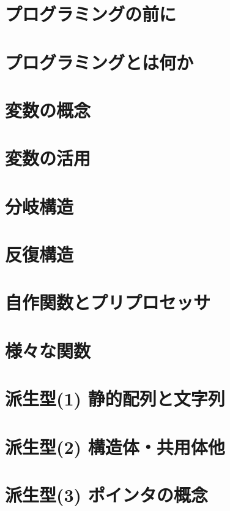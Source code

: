 \documentclass[a4j,12pt]{jreport}
\begin{document}
\tableofcontents
\newpage
{}
\setcounter{chapter}{-1}
\chapter{プログラミングの前に}


\chapter{プログラミングとは何か}


\chapter{変数の概念}


\chapter{変数の活用}


\chapter{分岐構造}


\chapter{反復構造}


\chapter{自作関数とプリプロセッサ}


\chapter{様々な関数}%


\chapter{派生型(1) 静的配列と文字列}


\chapter{派生型(2) 構造体・共用体他}


\chapter{派生型(3) ポインタの概念}

\end{document}
